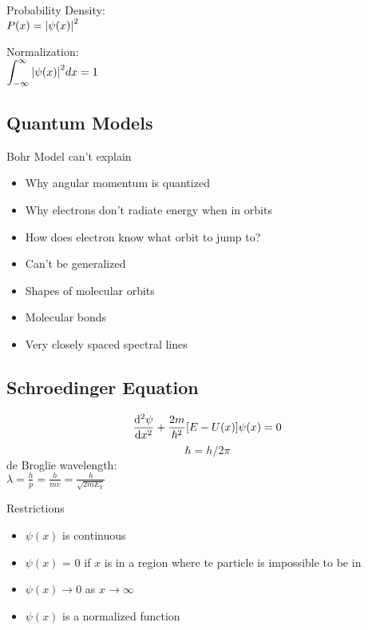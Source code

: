 \documentclass[12pt,landscape]{article}
\newcommand{\tab}{\hspace{.02\textwidth}}
\newcommand{\ds}{\displaystyle}
\begin{document}
\begin{multicols}{3}
	Probability Density:\\
	\tab $P(x) = \abs{\psi (x)}^2$
	
	Normalization:\\
	\tab $\ds \int_{-\infty}^{\infty} \abs{\psi (x)}^2 dx = 1$
	
	\subsection{Quantum Models}
	Bohr Model can't explain
	\begin{itemize}[leftmargin=0.5cm]
		\itemsep0em
		\item Why angular momentum is quantized
		\item Why electrons don't radiate energy when in orbits
		\item How does electron know what orbit to jump to?
		\item Can't be generalized
		\item Shapes of molecular orbits
		\item Molecular bonds
		\item Very closely spaced spectral lines
	\end{itemize}

	\subsection{Schroedinger Equation}
	$$\dv[2]{\psi}{x}+\frac{2m}{\hbar^2}[E - U(x)]\psi (x) = 0$$
	$$\hbar = h/2\pi$$
	de Broglie wavelength:\\
	\tab $ \ds \lambda = \frac{h}{p} = \frac{h}{mv} = \frac{h}{\sqrt{2m E_k}}$
	
	Restrictions
	\begin{itemize}[leftmargin=0.5cm]
		\itemsep0em
		\item $\psi (x)$ is continuous
		\item $\psi (x)$ = 0 if $x$ is in a region where te particle is impossible to be in
		\item $\psi (x) \rightarrow 0$ as $x \rightarrow \infty$
		\item $\psi (x)$ is a normalized function
	\end{itemize}


\end{multicols}
\end{document}
